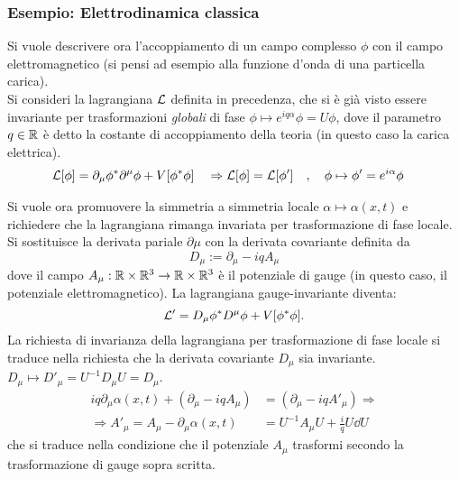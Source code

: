 \subsubsection{Esempio: Elettrodinamica classica}
Si vuole descrivere ora l'accoppiamento di un campo complesso $\phi$ con il campo
elettromagnetico (si pensi ad esempio alla funzione d'onda di una particella carica).\\
Si consideri la lagrangiana $\mathcal{L}$ definita in precedenza, che si è già visto
essere invariante per trasformazioni \emph{globali} di fase $\phi \mapsto e^{iq\alpha}\phi = U\phi$,
dove il parametro $q \in \mathbb{R}$ è detto la costante di accoppiamento della teoria
(in questo caso la carica elettrica).
\begin{equation*}
  \begin{aligned}
     \mathcal{L} [\phi] & = \partial _\mu \phi^*  \partial ^\mu \phi + V[\phi ^* \phi] &
     & \Rightarrow \mathcal{L}[\phi] = \mathcal{L}[\phi'] & ,\quad
     \phi &\mapsto \phi' = e^{i\alpha}\phi
  \end{aligned}
\end{equation*}

Si vuole ora promuovere la simmetria a simmetria locale $\alpha \mapsto \alpha(x,t)$
e richiedere che la lagrangiana rimanga invariata per trasformazione di fase locale.
Si sostituisce la derivata pariale $\partial \mu$ con la derivata covariante
definita da
$$
   D _\mu := \partial _\mu -iq A _\mu
$$
dove il campo $A _\mu : \mathbb{R} \times \mathbb{R}^3 \to \mathbb{R} \times \mathbb{R}^3$ è il potenziale
di gauge (in questo caso, il potenziale elettromagnetico). La lagrangiana
gauge-invariante diventa:
$$
   \mathcal{L} ' =  D _\mu \phi^*  D ^\mu \phi + V[\phi ^* \phi].
$$
La richiesta di invarianza della lagrangiana per trasformazione
di fase locale si traduce nella richiesta che la derivata covariante $D _\mu$
sia invariante. $D _\mu \mapsto D' _\mu = U^{-1} D _\mu U = D _\mu $.
\begin{equation}
   \begin{aligned}
      iq \partial _\mu \alpha(x,t) + (\partial _\mu - iq A _\mu)
         & = (\partial _\mu -iq A' _\mu) \Rightarrow \\
      \Rightarrow A' _\mu = A _\mu - \partial _\mu  \alpha(x,t)
         & = U ^{-1} A _\mu U + \frac{i}{q} U \dd U
   \end{aligned}
\end{equation}
che si traduce nella condizione che il potenziale $A _\mu$ trasformi secondo la
trasformazione di gauge sopra scritta.\\

